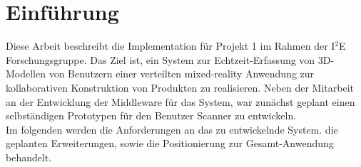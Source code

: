 \section{Einführung}

Diese Arbeit beschreibt die Implementation für Projekt 1 im Rahmen der I$^2$E Forschungsgruppe. Das Ziel ist, ein System zur Echtzeit-Erfassung von 3D-Modellen von Benutzern einer verteilten mixed-reality Anwendung zur kollaborativen Konstruktion von Produkten zu realisieren. Neben der Mitarbeit an der Entwicklung der Middleware für das System, war zunächst geplant einen selbständigen Prototypen für den Benutzer Scanner zu entwickeln.\\
Im folgenden werden die Anforderungen an das zu entwickelnde System. die geplanten Erweiterungen, sowie die Positionierung zur Gesamt-Anwendung behandelt.